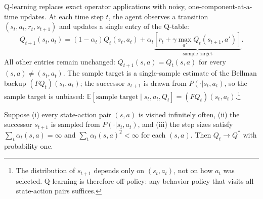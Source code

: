 Q-learning \citep{WatkinsDayan1992} replaces exact operator applications with noisy, one-component-at-a-time updates. At each time step $t$, the agent observes a transition $(s_t, a_t, r_t, s_{t+1})$ and updates a single entry of the Q-table:
\begin{equation}
Q_{t+1}(s_t, a_t) = (1 - \alpha_t) Q_t(s_t, a_t) + \alpha_t \underbrace{\left[ r_t + \gamma \max_{a'} Q_t(s_{t+1}, a') \right]}_{\text{sample target}}.
\label{eq:q_learning}
\end{equation}
All other entries remain unchanged: $Q_{t+1}(s,a) = Q_t(s,a)$ for every $(s,a) \neq (s_t, a_t)$. The sample target is a single-sample estimate of the Bellman backup $(FQ_t)(s_t,a_t)$; the successor $s_{t+1}$ is drawn from $P(\cdot|s_t,a_t)$, so the sample target is unbiased: $\mathbb{E}[\text{sample target} \mid s_t, a_t, Q_t] = (FQ_t)(s_t,a_t)$.\footnote{The distribution of $s_{t+1}$ depends only on $(s_t, a_t)$, not on how $a_t$ was selected. Q-learning is therefore off-policy: any behavior policy that visits all state-action pairs suffices.}

\begin{theorem}
\label{thm:q_learning_convergence}
Suppose (i) every state-action pair $(s,a)$ is visited infinitely often, (ii) the successor $s_{t+1}$ is sampled from $P(\cdot|s_t,a_t)$, and (iii) the step sizes satisfy $\sum_t \alpha_t(s,a) = \infty$ and $\sum_t \alpha_t(s,a)^2 < \infty$ for each $(s,a)$. Then $Q_t \to Q^*$ with probability one.
\end{theorem}

